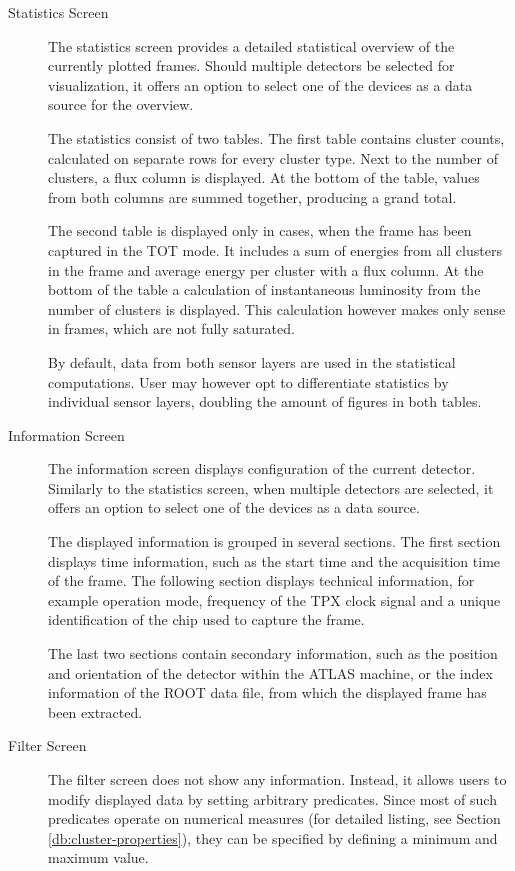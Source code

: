 \begin{description}
	\item[Statistics Screen]
	The statistics screen provides a detailed statistical overview of the currently plotted frames. Should multiple detectors be selected for visualization, it offers an option to select one of the devices as a data source for the overview.

	The statistics consist of two tables. The first table contains cluster counts, calculated on separate rows for every cluster type. Next to the number of clusters, a flux column is displayed. At the bottom of the table, values from both columns are summed together, producing a grand total.

	The second table is displayed only in cases, when the frame has been captured in the TOT mode. It includes a sum of energies from all clusters in the frame and average energy per cluster with a flux column. At the bottom of the table a calculation of instantaneous luminosity from the number of clusters is displayed. This calculation however makes only sense in frames, which are not fully saturated.

	By default, data from both sensor layers are used in the statistical computations. User may however opt to differentiate statistics by individual sensor layers, doubling the amount of figures in both tables.

	\item[Information Screen]
	The information screen displays configuration of the current detector. Similarly to the statistics screen, when multiple detectors are selected, it offers an option to select one of the devices as a data source.

	The displayed information is grouped in several sections. The first section displays time information, such as the start time and the acquisition time of the frame. The following section displays technical information, for example operation mode, frequency of the TPX clock signal and a unique identification of the chip used to capture the frame.

	The last two sections contain secondary information, such as the position and orientation of the detector within the ATLAS machine, or the index information of the ROOT data file, from which the displayed frame has been extracted.

	\item[Filter Screen]
	The filter screen does not show any information. Instead, it allows users to modify displayed data by setting arbitrary predicates. Since most of such predicates operate on numerical measures (for detailed listing, see Section \ref{db:cluster-properties}), they can be specified by defining a minimum and maximum value.


\end{description}

